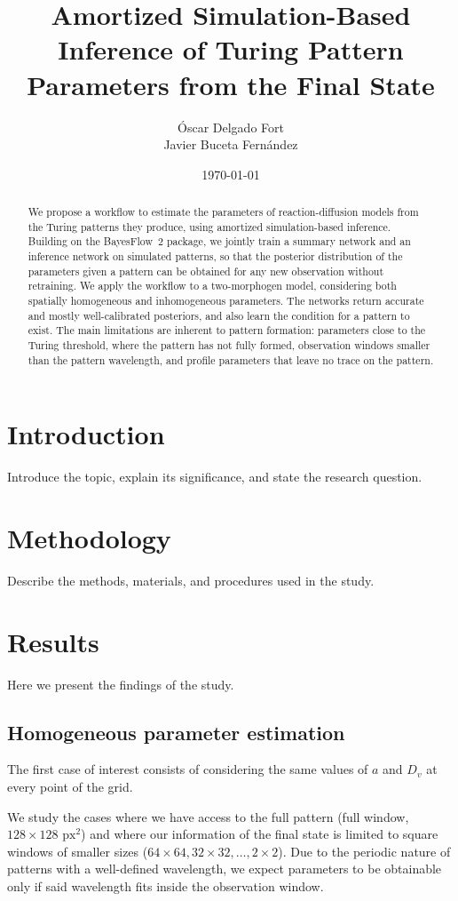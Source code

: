 \documentclass[12pt]{article}
\title{Amortized Simulation-Based Inference of Turing Pattern Parameters from the Final State}
\author{Óscar Delgado Fort\\ Javier Buceta Fernández}
\date{\today}
\begin{document}
\maketitle

\begin{abstract}
    We propose a workflow to estimate the parameters of reaction-diffusion models from the
    Turing patterns they produce, using amortized simulation-based inference. Building on the BayesFlow~2
    package\cite{bayesflow2}, we jointly train a summary network and an inference network on
    simulated patterns, so that the posterior distribution of the parameters given a pattern can
    be obtained for any new observation without retraining. We apply the workflow to a two-morphogen
    model, considering both spatially homogeneous and inhomogeneous parameters.
    The networks return accurate and mostly well-calibrated posteriors, and also learn the condition
    for a pattern to exist. The main limitations are inherent to pattern formation: parameters close to
    the Turing threshold, where the pattern has not fully formed, observation windows smaller than
    the pattern wavelength, and profile parameters that leave no trace on the pattern.
\end{abstract}

\section{Introduction}
Introduce the topic, explain its significance, and state the research question.

\section{Methodology}
Describe the methods, materials, and procedures used in the study.

\section{Results}
Here we present the findings of the study.

    \subsection{Homogeneous parameter estimation}
        The first case of interest consists of considering the same values of $a$ and $D_v$ at every point of the grid.

        We study the cases where we have access to the full pattern (full window, $128 \times 128 \text{ px}^2$) and where our information
        of the final state is limited to square windows of smaller sizes ($64 \times 64, 32 \times 32, \ldots, 2 \times 2$). Due to the
        periodic nature of patterns with a well-defined wavelength, we expect parameters to be obtainable
        only if said wavelength fits inside the observation window.
\end{document}
